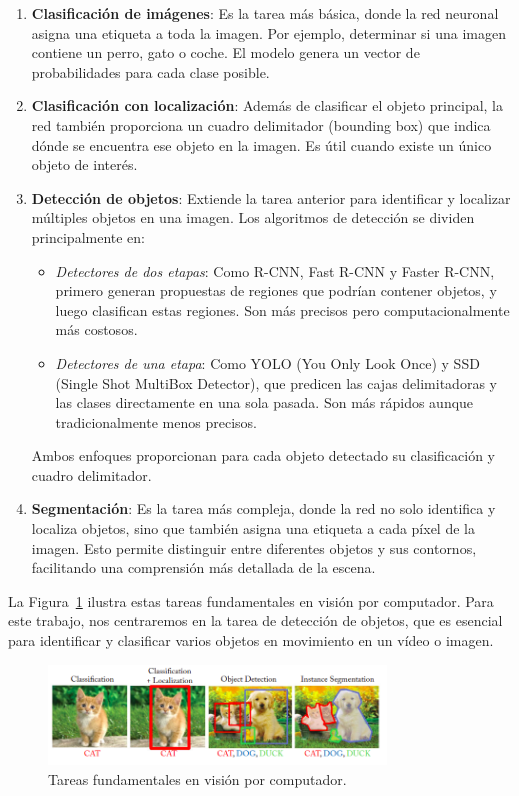 \documentclass[11pt,spanish,listoffigures,listoftables]{tfgetsinf}
\begin{document}
\begin{enumerate}
    \item \textbf{Clasificación de imágenes}: Es la tarea más básica, donde la red neuronal asigna una etiqueta a toda la imagen. Por ejemplo, determinar si una imagen contiene un perro, gato o coche. El modelo genera un vector de probabilidades para cada clase posible.
    
    \item \textbf{Clasificación con localización}: Además de clasificar el objeto principal, la red también proporciona un cuadro delimitador (bounding box) que indica dónde se encuentra ese objeto en la imagen. Es útil cuando existe un único objeto de interés.
    
   \item \textbf{Detección de objetos}: Extiende la tarea anterior para identificar y localizar múltiples objetos en una imagen. Los algoritmos de detección se dividen principalmente en:
      \begin{itemize}
         \item \textit{Detectores de dos etapas}: Como R-CNN, Fast R-CNN y Faster R-CNN, primero generan propuestas de regiones que podrían contener objetos, y luego clasifican estas regiones. Son más precisos pero computacionalmente más costosos.
         \item \textit{Detectores de una etapa}: Como YOLO (You Only Look Once) y SSD (Single Shot MultiBox Detector), que predicen las cajas delimitadoras y las clases directamente en una sola pasada. Son más rápidos aunque tradicionalmente menos precisos.
      \end{itemize}
      Ambos enfoques proporcionan para cada objeto detectado su clasificación y cuadro delimitador.
    
    \item \textbf{Segmentación}: Es la tarea más compleja, donde la red no solo identifica y localiza objetos, sino que también asigna una etiqueta a cada píxel de la imagen. Esto permite distinguir entre diferentes objetos y sus contornos, facilitando una comprensión más detallada de la escena.
\end{enumerate}

La Figura~\ref{fig:tareas_vision_por_computador} ilustra estas tareas fundamentales en visión por computador. Para este trabajo, nos centraremos en la tarea de detección de objetos, que es esencial para identificar y clasificar varios objetos en movimiento en un vídeo o imagen. 

\begin{figure}[H]
   \centering
   \includegraphics[width=0.8\textwidth]{images/estado_del_arte/diferentes_formas_de_detectar.png}
   \caption{Tareas fundamentales en visión por computador.}
   \label{fig:tareas_vision_por_computador}
\end{figure}
\end{document}
